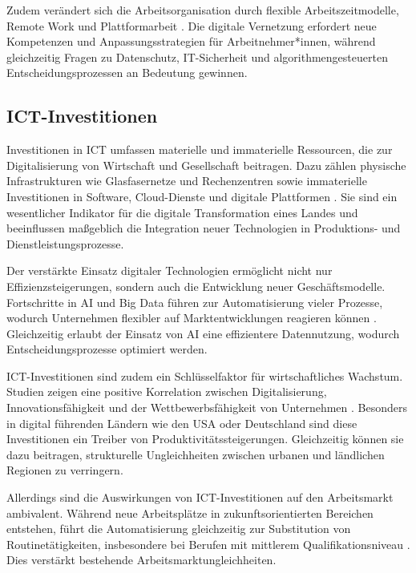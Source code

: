Zudem verändert sich die Arbeitsorganisation durch flexible Arbeitszeitmodelle, Remote Work 
und Plattformarbeit \parencite[S. 112]{schwab2016thefourth}. Die digitale Vernetzung erfordert 
neue Kompetenzen und Anpassungsstrategien für Arbeitnehmer*innen, während gleichzeitig 
Fragen zu Datenschutz, IT-Sicherheit und algorithmengesteuerten Entscheidungsprozessen an 
Bedeutung gewinnen.


\subsection{ICT-Investitionen}

Investitionen in \ac{ICT} umfassen materielle und immaterielle Ressourcen, die zur 
Digitalisierung von Wirtschaft und Gesellschaft beitragen. Dazu zählen physische Infrastrukturen 
wie Glasfasernetze und Rechenzentren sowie immaterielle Investitionen in Software, Cloud-Dienste 
und digitale Plattformen \parencite[S. 15ff]{oecd2019measuring}. Sie sind ein wesentlicher 
Indikator für die digitale Transformation eines Landes und beeinflussen maßgeblich die 
Integration neuer Technologien in Produktions- und Dienstleistungsprozesse.

Der verstärkte Einsatz digitaler Technologien ermöglicht nicht nur Effizienzsteigerungen, 
sondern auch die Entwicklung neuer Geschäftsmodelle. Fortschritte in \ac{AI} und Big Data 
führen zur Automatisierung vieler Prozesse, wodurch Unternehmen flexibler auf 
Marktentwicklungen reagieren können \parencite[S. 15ff]{oecd2019measuring}. Gleichzeitig 
erlaubt der Einsatz von \ac{AI} eine effizientere Datennutzung, wodurch Entscheidungsprozesse 
optimiert werden.

\ac{ICT}-Investitionen sind zudem ein Schlüsselfaktor für wirtschaftliches Wachstum. Studien 
zeigen eine positive Korrelation zwischen Digitalisierung, Innovationsfähigkeit und der 
Wettbewerbsfähigkeit von Unternehmen \parencite[S. 22]{brynjolfsson2014thesecond}. Besonders 
in digital führenden Ländern wie den USA oder Deutschland sind diese Investitionen ein Treiber 
von Produktivitätssteigerungen. Gleichzeitig können sie dazu beitragen, strukturelle 
Ungleichheiten zwischen urbanen und ländlichen Regionen zu verringern.

Allerdings sind die Auswirkungen von \ac{ICT}-Investitionen auf den Arbeitsmarkt ambivalent. 
Während neue Arbeitsplätze in zukunftsorientierten Bereichen entstehen, führt die Automatisierung 
gleichzeitig zur Substitution von Routinetätigkeiten, insbesondere bei Berufen mit mittlerem 
Qualifikationsniveau \parencite[S. 40]{frey2013thefuture}. Dies verstärkt bestehende 
Arbeitsmarktungleichheiten.

